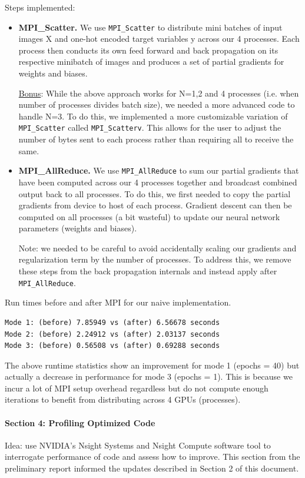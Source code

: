 \documentclass[12pt,letterpaper,twoside]{article}
\begin{document}
Steps implemented:
\begin{itemize}
    \item \textbf{MPI\_Scatter.} We use \texttt{MPI\_Scatter} to distribute mini batches
    of input images X and one-hot encoded target variables y across our 4 processes.
    Each process then conducts its own feed forward and back propagation on its
    respective minibatch of images and produces a set of partial gradients for
    weights and biases.

    \underline{Bonus}: While the above approach works for N=1,2 and 4 processes (i.e. when
    number of processes divides batch size), we needed a more advanced code to handle N=3.
    To do this, we implemented a more customizable variation of \texttt{MPI\_Scatter}
    called \texttt{MPI\_Scatterv}. This allows for the user to adjust the number of
    bytes sent to each process rather than requiring all to receive the same.

    \item \textbf{MPI\_AllReduce.} We use \texttt{MPI\_AllReduce} to sum our partial
    gradients that have been computed across our 4 processes together and broadcast
    combined output back to all processes. To do this, we first needed to copy the
    partial gradients from device to host of each process. Gradient descent can then
    be computed on all processes (a bit wasteful) to update our neural network
    parameters (weights and biases).

    Note: we needed to be careful to avoid accidentally scaling our gradients and
    regularization term by the number of processes. To address this, we remove these
    steps from the back propagation internals and instead apply after \texttt{MPI\_AllReduce}.
\end{itemize}

Run times before and after MPI for our naive implementation.
\begin{verbatim}
Mode 1: (before) 7.85949 vs (after) 6.56678 seconds
Mode 2: (before) 2.24912 vs (after) 2.03137 seconds
Mode 3: (before) 0.56508 vs (after) 0.69288 seconds
\end{verbatim}

The above runtime statistics show an improvement for mode 1 (epochs = 40) but actually
a decrease in performance for mode 3 (epochs = 1). This is because we incur a lot of
MPI setup overhead regardless but do not compute enough iterations to benefit from
distributing across 4 GPUs (processes).


\pagebreak
\paragraph{Section 4: Profiling Optimized Code} Idea: use NVIDIA's Nsight Systems and Nsight
Compute software tool to interrogate performance of code and assess how to improve. This
section from the preliminary report informed the updates described in Section 2 of this
document.
\end{document}
